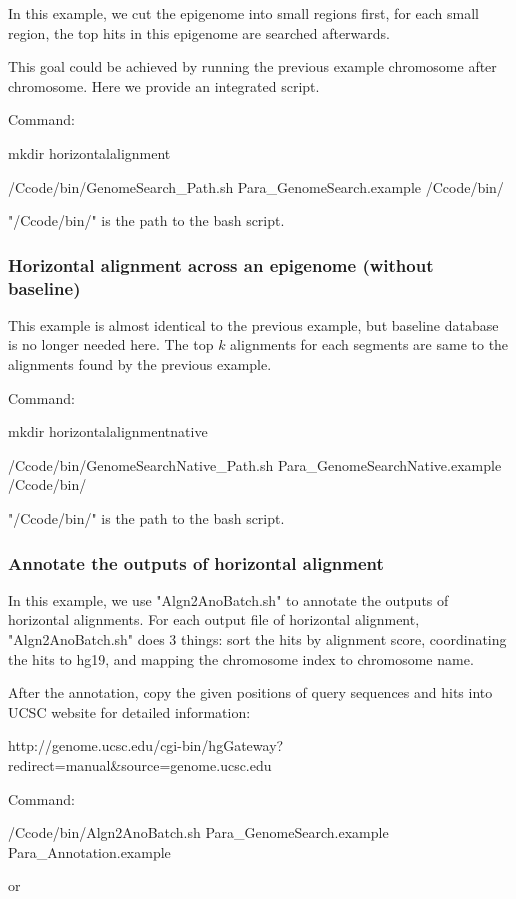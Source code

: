 \documentclass[a4paper]{article}
\begin{document}
\begin{CJK*}{UTF8}{kai}
In this example, we cut the epigenome into small regions first, for each small region, the top hits in this epigenome are searched afterwards. 

This goal could be achieved by running the previous example chromosome after chromosome. Here we provide an integrated script.

Command: 

mkdir horizontalalignment

/Ccode/bin/GenomeSearch\_Path.sh Para\_GenomeSearch.example /Ccode/bin/

"/Ccode/bin/" is the path to the bash script.

\subsubsection{Horizontal alignment across an epigenome (without baseline)}

This example is almost identical to the previous example, but baseline database is no longer needed here. The top $k$ alignments for each segments are same to the alignments found by the previous example.

Command: 

mkdir horizontalalignmentnative

/Ccode/bin/GenomeSearchNative\_Path.sh Para\_GenomeSearchNative.example /Ccode/bin/

"/Ccode/bin/" is the path to the bash script.

\subsubsection{Annotate the outputs of horizontal alignment}

In this example, we use "Algn2AnoBatch.sh" to annotate the outputs of horizontal alignments. For each output file of horizontal alignment, "Algn2AnoBatch.sh" does 3 things: sort the hits by alignment score, coordinating the hits to hg19, and mapping the chromosome index to chromosome name. 

After the annotation, copy the given positions of query sequences and hits into UCSC website for detailed information:

http://genome.ucsc.edu/cgi-bin/hgGateway?redirect=manual\&source=genome.ucsc.edu

Command: 

/Ccode/bin/Algn2AnoBatch.sh Para\_GenomeSearch.example Para\_Annotation.example

or


\end{CJK*}
\end{document}
